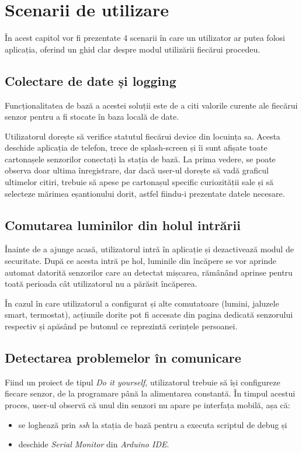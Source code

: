 \chapter{Scenarii de utilizare}

În acest capitol vor fi prezentate 4 scenarii în care un utilizator ar putea folosi aplicația, oferind un ghid clar despre modul utilizării fiecărui procedeu.

\section{Colectare de date și logging}

Funcționalitatea de bază a acestei soluții este de a citi valorile curente ale fiecărui senzor pentru a fi stocate în baza locală de date.

Utilizatorul dorește să verifice statutul fiecărui device din locuința sa. Acesta deschide aplicația de telefon, trece de splash-screen și îi sunt afișate toate cartonașele senzorilor conectați la stația de bază. La prima vedere, se poate observa doar ultima înregistrare, dar dacă user-ul dorește să vadă graficul ultimelor citiri, trebuie să apese pe cartonașul specific curiozității sale și să selecteze mărimea eșantionului dorit, astfel fiindu-i prezentate datele necesare. 

\section{Comutarea luminilor din holul intrării}

Înainte de a ajunge acasă, utilizatorul intră în aplicație și dezactivează modul de securitate. După ce acesta intră pe hol, luminile din încăpere se vor aprinde automat datorită senzorilor care au detectat mișcarea, rămânând aprinse pentru toată perioada cât utilizatorul nu a părăsit încăperea. 

În cazul în care utilizatorul a configurat și alte comutatoare (lumini, jaluzele smart, termostat), acțiunile dorite pot fi accesate din pagina dedicată senzorului respectiv și apăsând pe butonul ce reprezintă cerințele persoanei.

\section{Detectarea problemelor în comunicare}

Fiind un proiect de tipul \emph{Do it yourself}, utilizatorul trebuie să își configureze fiecare senzor, de la programare până la alimentarea constantă. În timpul acestui proces, user-ul observă că unul din senzori nu apare pe interfața mobilă, așa că:
\begin{itemize}
	\item se loghează prin \emph{ssh} la stația de bază pentru a executa scriptul de debug și
	\item deschide \emph{Serial Monitor} din \emph{Arduino IDE}.
\end{itemize}

